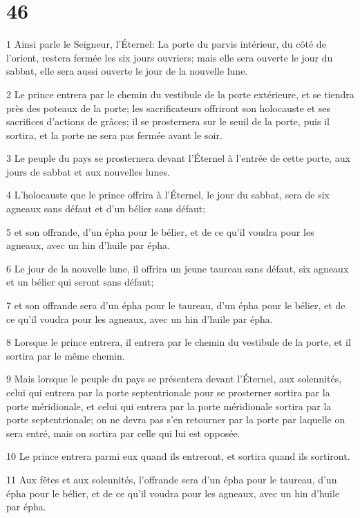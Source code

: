 \chapter{46}

\par 1 Ainsi parle le Seigneur, l'Éternel: La porte du parvis intérieur, du côté de l'orient, restera fermée les six jours ouvriers; mais elle sera ouverte le jour du sabbat, elle sera aussi ouverte le jour de la nouvelle lune.
\par 2 Le prince entrera par le chemin du vestibule de la porte extérieure, et se tiendra près des poteaux de la porte; les sacrificateurs offriront son holocauste et ses sacrifices d'actions de grâces; il se prosternera sur le seuil de la porte, puis il sortira, et la porte ne sera pas fermée avant le soir.
\par 3 Le peuple du pays se prosternera devant l'Éternel à l'entrée de cette porte, aux jours de sabbat et aux nouvelles lunes.
\par 4 L'holocauste que le prince offrira à l'Éternel, le jour du sabbat, sera de six agneaux sans défaut et d'un bélier sans défaut;
\par 5 et son offrande, d'un épha pour le bélier, et de ce qu'il voudra pour les agneaux, avec un hin d'huile par épha.
\par 6 Le jour de la nouvelle lune, il offrira un jeune taureau sans défaut, six agneaux et un bélier qui seront sans défaut;
\par 7 et son offrande sera d'un épha pour le taureau, d'un épha pour le bélier, et de ce qu'il voudra pour les agneaux, avec un hin d'huile par épha.
\par 8 Lorsque le prince entrera, il entrera par le chemin du vestibule de la porte, et il sortira par le même chemin.
\par 9 Mais lorsque le peuple du pays se présentera devant l'Éternel, aux solennités, celui qui entrera par la porte septentrionale pour se prosterner sortira par la porte méridionale, et celui qui entrera par la porte méridionale sortira par la porte septentrionale; on ne devra pas s'en retourner par la porte par laquelle on sera entré, mais on sortira par celle qui lui est opposée.
\par 10 Le prince entrera parmi eux quand ils entreront, et sortira quand ils sortiront.
\par 11 Aux fêtes et aux solennités, l'offrande sera d'un épha pour le taureau, d'un épha pour le bélier, et de ce qu'il voudra pour les agneaux, avec un hin d'huile par épha.
